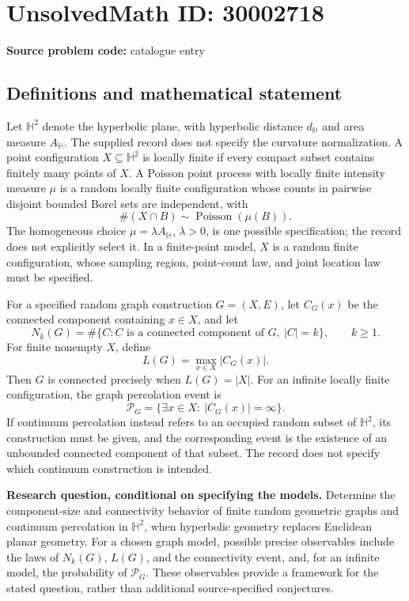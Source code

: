 \documentclass[11pt]{article}
\begin{document}
\section*{UnsolvedMath ID: 30002718}
\textbf{Source problem code:} catalogue entry
\subsection{Definitions and mathematical statement}
Let \(\mathbb H^2\) denote the hyperbolic plane, with hyperbolic distance \(d_{\mathbb H}\) and area measure \(A_{\mathbb H}\). The supplied record does not specify the curvature normalization. A point configuration \(X\subseteq\mathbb H^2\) is locally finite if every compact subset contains finitely many points of \(X\). A Poisson point process with locally finite intensity measure \(\mu\) is a random locally finite configuration whose counts in pairwise disjoint bounded Borel sets are independent, with
\[
\#(X\cap B)\sim\operatorname{Poisson}(\mu(B)).
\]
The homogeneous choice \(\mu=\lambda A_{\mathbb H}\), \(\lambda>0\), is one possible specification; the record does not explicitly select it. In a finite-point model, \(X\) is a random finite configuration, whose sampling region, point-count law, and joint location law must be specified.

For a specified random graph construction \(G=(X,E)\), let \(C_G(x)\) be the connected component containing \(x\in X\), and let
\[
N_k(G)=\#\{C:C\text{ is a connected component of }G,\ |C|=k\},\qquad k\geq1.
\]
For finite nonempty \(X\), define
\[
L(G)=\max_{x\in X}|C_G(x)|.
\]
Then \(G\) is connected precisely when \(L(G)=|X|\). For an infinite locally finite configuration, the graph percolation event is
\[
\mathcal P_G=\{\exists x\in X:\ |C_G(x)|=\infty\}.
\]
If continuum percolation instead refers to an occupied random subset of \(\mathbb H^2\), its construction must be given, and the corresponding event is the existence of an unbounded connected component of that subset. The record does not specify which continuum construction is intended.

\textbf{Research question, conditional on specifying the models.} Determine the component-size and connectivity behavior of finite random geometric graphs and continuum percolation in \(\mathbb H^2\), when hyperbolic geometry replaces Euclidean planar geometry. For a chosen graph model, possible precise observables include the laws of \(N_k(G)\), \(L(G)\), and the connectivity event, and, for an infinite model, the probability of \(\mathcal P_G\). These observables provide a framework for the stated question, rather than additional source-specified conjectures.
\end{document}

